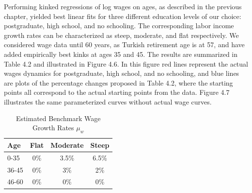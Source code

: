 \documentclass[]{elsarticle}
\begin{document}
Performing kinked regressions of log wages on ages, as described in the previous chapter, yielded best linear fits for three different education levels of our choice: postgraduate, high school, and no schooling. The corresponding labor income growth rates can be characterized as steep, moderate, and flat respectively. We considered wage data until 60 years, as Turkish retirement age is at 57, and have added empirically best kinks at ages 35 and 45. The results are summarized in Table 4.2 and illustrated in Figure 4.6. In this figure red lines represent the actual wages dynamics for postgraduate, high school, and no schooling, and blue lines are plots of the percentage changes proposed in Table 4.2, where the starting points all correspond to the actual starting points from the data. Figure 4.7 illustrates the same parameterized curves without actual wage curves. 

\begin{table}
	\centering
	\caption{Estimated Benchmark Wage Growth Rates $\mu_w$}
	\begin{tabular}[c]{l|ccc}
		Age&Flat&Moderate&Steep\\
		\hline
		0-35&0\%&3.5\%&6.5\%\\
		36-45&0\%&3\%&2\%\\
		46-60&0\%&0\%&0\%\\
	\end{tabular}
\end{table}
\end{document}
